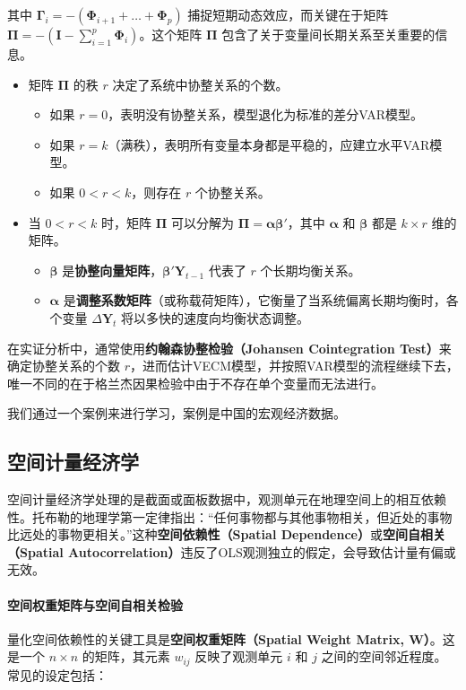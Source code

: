 其中 $\mathbf{\Gamma}_i = -(\mathbf{\Phi}_{i+1} + \dots + \mathbf{\Phi}_p)$ 捕捉短期动态效应，而关键在于矩阵 $\mathbf{\Pi} = -(\mathbf{I} - \sum_{i=1}^p \mathbf{\Phi}_i)$。这个矩阵 $\mathbf{\Pi}$ 包含了关于变量间长期关系至关重要的信息。
\begin{itemize}
    \item 矩阵 $\mathbf{\Pi}$ 的秩 $r$ 决定了系统中协整关系的个数。
    \begin{itemize}
        \item 如果 $r=0$，表明没有协整关系，模型退化为标准的差分VAR模型。
        \item 如果 $r=k$（满秩），表明所有变量本身都是平稳的，应建立水平VAR模型。
        \item 如果 $0 < r < k$，则存在 $r$ 个协整关系。
    \end{itemize}
    \item 当 $0 < r < k$ 时，矩阵 $\mathbf{\Pi}$ 可以分解为 $\mathbf{\Pi} = \boldsymbol{\alpha}\boldsymbol{\beta}'$，其中 $\boldsymbol{\alpha}$ 和 $\boldsymbol{\beta}$ 都是 $k \times r$ 维的矩阵。
    \begin{itemize}
        \item $\boldsymbol{\beta}$ 是\textbf{协整向量矩阵}，$\boldsymbol{\beta}' \mathbf{Y}_{t-1}$ 代表了 $r$ 个长期均衡关系。
        \item $\boldsymbol{\alpha}$ 是\textbf{调整系数矩阵}（或称载荷矩阵），它衡量了当系统偏离长期均衡时，各个变量 $\Delta \mathbf{Y}_t$ 将以多快的速度向均衡状态调整。
    \end{itemize}
\end{itemize}

在实证分析中，通常使用\textbf{约翰森协整检验（Johansen Cointegration Test）}来确定协整关系的个数 $r$，进而估计VECM模型，并按照VAR模型的流程继续下去，唯一不同的在于格兰杰因果检验中由于不存在单个变量而无法进行。

我们通过一个案例来进行学习，案例是中国的宏观经济数据。
\subsection{空间计量经济学}
空间计量经济学处理的是截面或面板数据中，观测单元在地理空间上的相互依赖性。托布勒的地理学第一定律指出：“任何事物都与其他事物相关，但近处的事物比远处的事物更相关。”这种\textbf{空间依赖性（Spatial Dependence）}或\textbf{空间自相关（Spatial Autocorrelation）}违反了OLS观测独立的假定，会导致估计量有偏或无效。

\paragraph*{空间权重矩阵与空间自相关检验}
量化空间依赖性的关键工具是\textbf{空间权重矩阵（Spatial Weight Matrix, W）}。这是一个 $n \times n$ 的矩阵，其元素 $w_{ij}$ 反映了观测单元 $i$ 和 $j$ 之间的空间邻近程度。常见的设定包括：

